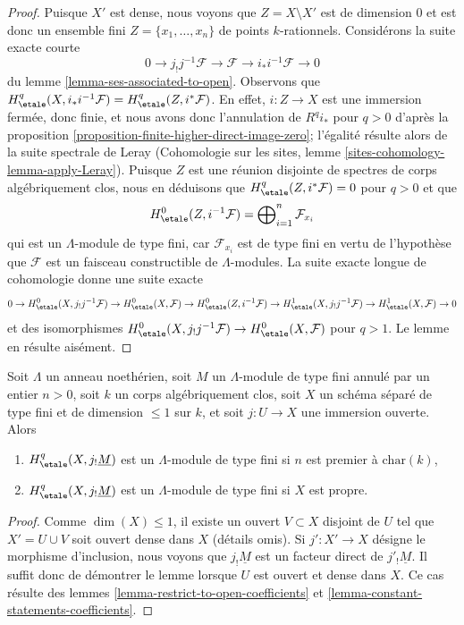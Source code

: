 \begin{proof}
Puisque $X'$ est dense, nous voyons que $Z = X \setminus X'$ est de dimension $0$
et est donc un ensemble fini $Z = \{x_1, \ldots, x_n\}$ de points $k$-rationnels.
Considérons la suite exacte courte
$$
0 \to j_!j^{-1}\mathcal{F} \to \mathcal{F} \to i_*i^{-1}\mathcal{F} \to 0
$$
du lemme \ref{lemma-ses-associated-to-open}. Observons que
$H^q_\etale(X, i_*i^{-1}\mathcal{F}) = H^q_\etale(Z, i^*\mathcal{F})$.
En effet, $i : Z \to X$ est une immersion fermée, donc finie,
et nous avons donc l'annulation de $R^qi_*$ pour $q > 0$ d'après la
proposition \ref{proposition-finite-higher-direct-image-zero};
l'égalité résulte alors de la suite spectrale de Leray
(Cohomologie sur les sites, lemme \ref{sites-cohomology-lemma-apply-Leray}).
Puisque $Z$ est une réunion disjointe de spectres de corps algébriquement
clos, nous en déduisons que $H^q_\etale(Z, i^*\mathcal{F}) = 0$
pour $q > 0$ et que
$$
H^0_\etale(Z, i^{-1}\mathcal{F}) =
\bigoplus\nolimits_{i=1}^n \mathcal{F}_{x_i}
$$
qui est un $\Lambda$-module de type fini, car $\mathcal{F}_{x_i}$ est de type fini en vertu de
l'hypothèse que $\mathcal{F}$ est un faisceau constructible de $\Lambda$-modules.
La suite exacte longue de cohomologie donne une suite exacte
$$
0 \to
H^0_\etale(X, j_!j^{-1}\mathcal{F}) \to
H^0_\etale(X, \mathcal{F}) \to
H^0_\etale(Z, i^{-1}\mathcal{F}) \to
H^1_\etale(X, j_!j^{-1}\mathcal{F}) \to
H^1_\etale(X, \mathcal{F}) \to 0
$$
et des isomorphismes $H^0_\etale(X, j_!j^{-1}\mathcal{F}) \to
H^0_\etale(X, \mathcal{F})$ pour $q > 1$. Le lemme en résulte aisément.
\end{proof}

\begin{lemma}
\label{lemma-somewhat-easier-coefficients}
Soit $\Lambda$ un anneau noethérien, soit $M$ un $\Lambda$-module de type fini annulé
par un entier $n > 0$, soit $k$ un corps algébriquement clos, soit $X$ un
schéma séparé de type fini et de dimension $\leq 1$ sur $k$, et soit
$j : U \to X$ une immersion ouverte. Alors
\begin{enumerate}
\item $H^q_\etale(X, j_!\underline{M})$ est un $\Lambda$-module de type fini
si $n$ est premier à $\text{char}(k)$,
\item $H^q_\etale(X, j_!\underline{M})$ est un $\Lambda$-module de type fini
si $X$ est propre.
\end{enumerate}
\end{lemma}

\begin{proof}
Comme $\dim(X) \leq 1$, il existe un ouvert $V \subset X$ disjoint de
$U$ tel que $X' = U \cup V$ soit ouvert dense dans $X$ (détails omis).
Si $j' : X' \to X$ désigne le morphisme d'inclusion, nous voyons que
$j_!\underline{M}$ est un facteur direct de $j'_!\underline{M}$.
Il suffit donc de démontrer le lemme lorsque $U$ est ouvert et dense dans $X$.
Ce cas résulte des lemmes \ref{lemma-restrict-to-open-coefficients}
et \ref{lemma-constant-statements-coefficients}.
\end{proof}

